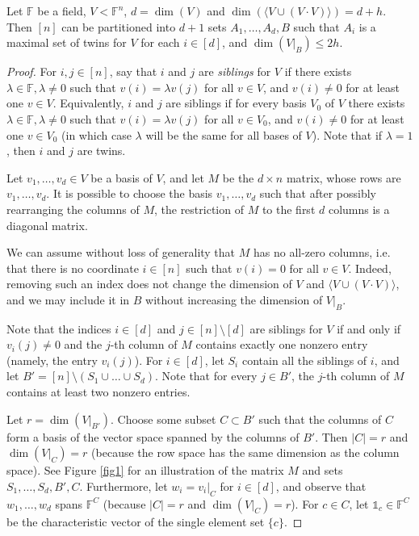 	
	\begin{theorem}\label{lemma:stability}
		Let $\mathbb{F}$ be a field, $V<\mathbb{F}^{n}$, $d=\dim(V)$ and 
		$\dim(\langle V\cup (V\cdot V)\rangle)=d+h$. Then $[n]$ can be partitioned into $d+1$ sets $A_1,\dots,A_{d},B$ such that $A_{i}$ is a maximal set of twins for $V$ for each $i\in [d]$, and $\dim(V|_{B})\leq 2h$. 
	\end{theorem} 
	
	\begin{proof}
		For $i,j\in [n]$, say that $i$ and $j$ are \emph{siblings} for $V$ if there exists $\lambda\in\mathbb{F},\lambda\neq0$ such that $v(i)=\lambda v(j)$ for all $v\in V$, and $v(i)\neq 0$ for at least one $v\in V$. 
		Equivalently, $i$ and $j$ are siblings if for every basis $V_0$ of $V$ there exists $\lambda\in\mathbb{F},\lambda\neq0$ such that $v(i)=\lambda v(j)$ for all $v\in V_0$, and $v(i)\neq 0$ for at least one $v\in V_0$ (in which case $\lambda$ will be the same for all bases of $V$).  Note that if $\lambda = 1$, then $i$ and $j$ are twins.
		
		Let $v_1,\dots,v_d\in V$ be a basis of $V$, and let $M$ be the $d\times n$ matrix, whose rows are $v_1,\dots,v_d$. It is possible to choose the basis $v_1,\dots,v_d$ such that after possibly rearranging the columns of $M$, the restriction of $M$ to the first $d$ columns is a diagonal matrix. 
		
		We can assume without loss of generality that $M$ has no all-zero columns, i.e. that there is no coordinate $i \in [n]$ such that $v(i) = 0$ for all $v \in V$. Indeed, removing such an index does not change the dimension of $V$ and $\langle V\cup (V\cdot V)\rangle$, and we may include it in $B$ without increasing the dimension of $V|_{B}$.
		
		Note that the indices $i\in [d]$ and $j\in [n]\setminus [d]$ are siblings for $V$ if and only if $v_i(j)\neq 0$ and the $j$-th column of $M$ contains exactly one nonzero entry (namely, the entry $v_i(j)$). For $i\in [d]$, let $S_i$ contain all the siblings of $i$, and let $B'=[n]\setminus (S_1\cup\dots\cup S_d)$. Note that for every $j\in B'$, the $j$-th column of $M$ contains at least two nonzero entries.
		
		Let $r=\dim(V|_{B'})$. Choose some subset $C\subset B'$ such that the columns of $C$ form a basis of the vector space spanned by the columns of $B'$. Then $|C|=r$ and $\dim(V|_{C})=r$ (because the row space has the same dimension as the column space). See Figure \ref{fig1} for an illustration of the matrix $M$ and sets $S_1,\dots,S_d,B',C$. Furthermore, let $w_{i}=v_{i}|_{C}$ for $i\in [d]$, and observe that $w_1,\dots,w_d$ spans $\mathbb{F}^{C}$ (because $|C| = r$ and $\dim(V|_{C})=r$). For $c\in C$, let $\mathds{1}_c\in\mathbb{F}^{C}$ be the characteristic vector of the single element set $\{c\}$.
		

\end{proof}
